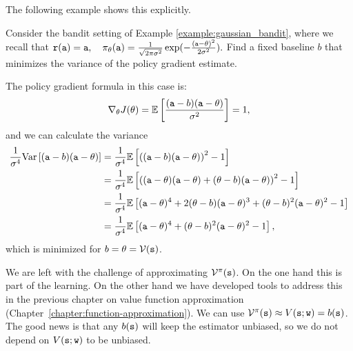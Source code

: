 The following example shows this explicitly.
\begin{example}
    Consider the bandit setting of Example \ref{example:gaussian_bandit}, where we recall that
$        {\tt r}({\tt a}) = {\tt a}, \quad
        \pi_\theta({\tt a}) = \frac{1}{\sqrt{2 \pi \sigma^2}} \exp (- \frac{({\tt a} - \theta)^2}{2 \sigma^2}).$
Find a fixed baseline $b$ that minimizes the variance of the policy gradient estimate.

The policy gradient formula in this case is:
\begin{equation*}
        \nabla_\theta J(\theta) = \mathbb{E} \left[\frac{({\tt a}-b)({\tt a} - \theta)}{\sigma^2}\right] = 1, 
\end{equation*}
and we can calculate the variance
\begin{equation*}
\begin{split}
        \frac{1}{\sigma^4}\textrm{Var}\left[({\tt a}-b)({\tt a} - \theta)\right]  
        &=\frac{1}{\sigma^4}\mathbb{E}\left[\left(({\tt a}-b)({\tt a} - \theta)\right)^2 - 1\right] \\
        &=\frac{1}{\sigma^4}\mathbb{E}\left[\left(({\tt a}-\theta)({\tt a} - \theta) + (\theta-b)({\tt a} - \theta)\right)^2 - 1\right] \\
        &=\frac{1}{\sigma^4}\mathbb{E}\left[({\tt a}-\theta)^4 + 2(\theta-b)({\tt a} - \theta)^3 + (\theta-b)^2({\tt a} - \theta)^2 - 1\right] \\
        &=\frac{1}{\sigma^4}\mathbb{E}\left[({\tt a}-\theta)^4 + (\theta-b)^2({\tt a} - \theta)^2 - 1\right],
\end{split}
\end{equation*}
which is minimized for $b=\theta = \mathcal{V}({\tt s})$.
\end{example}


We are left with the challenge of approximating
$\mathcal{V}^\pi({\tt s})$. On the one hand this is part of the
learning. On the other hand we have developed tools to address this
in the previous chapter on value function approximation (Chapter~\ref{chapter:function-approximation}). We can use
$\mathcal{V}^\pi({\tt s})\approx V({\tt s};{\tt w})=b({\tt s})$. The
good news is that any $b({\tt s})$ will keep the estimator unbiased,
so we do not depend on $V({\tt s};{\tt w})$ to be unbiased.

